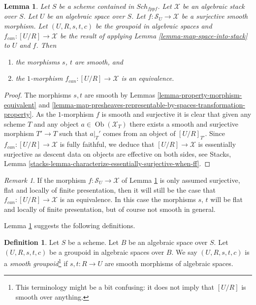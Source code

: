 \documentclass{stacks-project}
\theoremstyle{plain}
\newtheorem{lemma}[subsection]{Lemma}
\theoremstyle{definition}
\newtheorem{definition}[subsection]{Definition}
\theoremstyle{remark}
\newtheorem{remark}[subsection]{Remark}
\numberwithin{equation}{subsection}
\def\Sch{\mathit{Sch}}
\def\Ob{\mathop{\mathrm{Ob}}\nolimits}
\begin{document}
\begin{lemma}
\label{lemma-stack-presentation}
Let $S$ be a scheme contained in $\Sch_{fppf}$.
Let $\mathcal{X}$ be an algebraic stack over $S$.
Let $U$ be an algebraic space over $S$.
Let $f : \mathcal{S}_U \to \mathcal{X}$ be a surjective smooth morphism.
Let $(U, R, s, t, c)$ be the groupoid in algebraic spaces
and $f_{can} : [U/R] \to \mathcal{X}$ be the result of applying
Lemma \ref{lemma-map-space-into-stack}
to $U$ and $f$. Then
\begin{enumerate}
\item the morphisms $s$, $t$ are smooth, and
\item the $1$-morphism $f_{can} : [U/R] \to \mathcal{X}$
is an equivalence.
\end{enumerate}
\end{lemma}

\begin{proof}
The morphisms $s, t$ are smooth by
Lemmas \ref{lemma-property-morphism-equivalent} and
\ref{lemma-map-presheaves-representable-by-spaces-transformation-property}.
As the $1$-morphism $f$ is smooth and
surjective it is clear that given any scheme $T$ and any object
$a \in \Ob(\mathcal{X}_T)$ there exists a smooth and surjective
morphism $T' \to T$ such that $a|_T'$ comes from an object of
$[U/R]_{T'}$. Since $f_{can} : [U/R] \to \mathcal{X}$
is fully faithful, we deduce that
$[U/R] \to \mathcal{X}$ is essentially surjective as
descent data on objects are effective on both sides, see
Stacks, Lemma \ref{stacks-lemma-characterize-essentially-surjective-when-ff}.
\end{proof}

\begin{remark}
\label{remark-flat-fp-presentation}
If the morphism $f : \mathcal{S}_U \to \mathcal{X}$ of
Lemma \ref{lemma-stack-presentation}
is only assumed surjective, flat and locally of finite presentation, then
it will still be the case that $f_{can} : [U/R] \to \mathcal{X}$ is an
equivalence. In this case the morphisms $s$, $t$ will be flat and
locally of finite presentation, but of course not smooth in general.
\end{remark}

\noindent
Lemma \ref{lemma-stack-presentation}
suggests the following definitions.

\begin{definition}
\label{definition-smooth-groupoid}
Let $S$ be a scheme. Let $B$ be an algebraic space over $S$.
Let $(U, R, s, t, c)$ be a groupoid in algebraic spaces over $B$.
We say $(U, R, s, t, c)$ is a {\it smooth groupoid}\footnote{This terminology
might be a bit confusing: it does not imply that $[U/R]$ is smooth
over anything.}
if $s, t : R \to U$ are smooth morphisms of algebraic spaces.
\end{definition}
\end{document}
